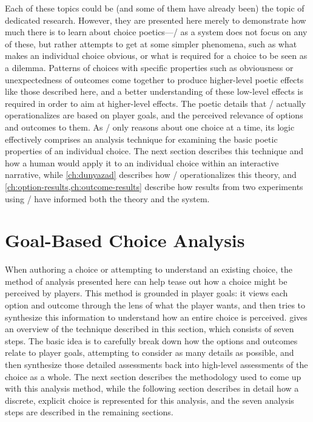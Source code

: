 Each of these topics could be (and some of them have already been) the topic of dedicated research.
%
However, they are presented here merely to demonstrate how much there is to learn about choice poetics---\dunyazad/ as a system does not focus on any of these, but rather attempts to get at some simpler phenomena, such as what makes an individual choice obvious, or what is required for a choice to be seen as a dilemma.
%
Patterns of choices with specific properties such as obviousness or unexpectedness of outcomes come together to produce higher-level poetic effects like those described here, and a better understanding of these low-level effects is required in order to aim at higher-level effects.
%
The poetic details that \dunyazad/ actually operationalizes are based on player goals, and the perceived relevance of options and outcomes to them.
%
As \dunyazad/ only reasons about one choice at a time, its logic effectively comprises an analysis technique for examining the basic poetic properties of an individual choice.
%
The next section describes this technique and how a human would apply it to an individual choice within an interactive narrative, while \cref{ch:dunyazad} describes how \dunyazad/ operationalizes this theory, and \cref{ch:option-results,ch:outcome-results} describe how results from two experiments using \dunyazad/ have informed both the theory and the system.

\section{Goal-Based Choice Analysis}

\label{sec:goal-based-choice-analysis}

When authoring a choice or attempting to understand an existing choice, the method of analysis presented here can help tease out how a choice might be perceived by players.
%
This method is grounded in player goals: it views each option and outcome through the lens of what the player wants, and then tries to synthesize this information to understand how an entire choice is perceived.
%
 gives an overview of the technique described in this section, which consists of seven steps.
%
The basic idea is to carefully break down how the options and outcomes relate to player goals, attempting to consider as many details as possible, and then synthesize those detailed assessments back into high-level assessments of the choice as a whole.
%
The next section describes the methodology used to come up with this analysis method, while the following section describes in detail how a discrete, explicit choice is represented for this analysis, and the seven analysis steps are described in the remaining sections.


